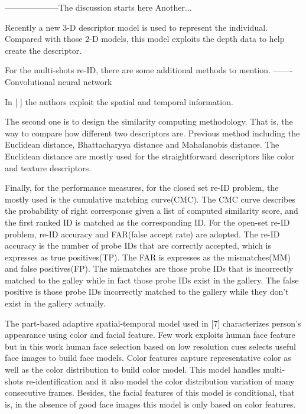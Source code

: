 --------------------The discussion starts here
Another...



Recently a new 3-D descriptor model is used to represent the individual. Compared with those 2-D models, this model exploits the depth data to help create the descriptor.

For the multi-shots re-ID, there are some additional methods to mention. ------- 
Convolutional neural network

In [ ] the authors exploit the spatial and temporal information.


The second one is to design the similarity computing methodology. That is, the way to compare how different two descriptors are. Previous method including the Euclidean distance, Bhattacharyya distance and Mahalanobis distance. The Euclidean distance are mostly used for the straightforward descriptors like color and texture descriptors. 

Finally, for the performance measures, for the closed set re-ID problem, the mostly used is the cumulative matching curve(CMC). The CMC curve describes the probability of right corresponse given a list of computed similarity score, and the first ranked ID is matched as the corresponding ID. For the open-set re-ID problem, re-ID accuracy and FAR(false accept rate) are adopted. The re-ID accuracy is the number of probe IDs that are correctly accepted, which is expresses as true positives(TP). The FAR is expresses as the mismatches(MM) and false positives(FP). The mismatches are those probe IDs that is incorrectly matched to the galley while in fact those probe IDs exist in the gallery. The false positive is those probe IDs incorrectly matched to the gallery while they don't exist in the gallery actually.




The part-based adaptive spatial-temporal model used in [7] characterizes person's appearance using color and facial feature. Few work exploits human face feature but in this work human face selection based on low resolution cues selects useful face images to build face models. Color features capture representative color as well as the color distribution to build color model. This model handles multi-shots re-identification and it also model the color distribution variation of many consecutive frames.  Besides, the facial features of this model is conditional, that is, in the absence of good face images this model is only based on color features.

